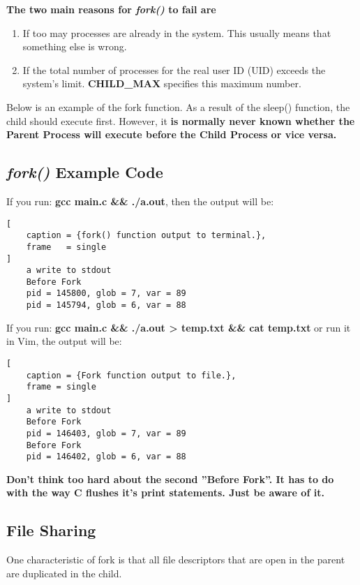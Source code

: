 \documentclass{article}
\newcommand\be[1]{\textbf{\emph{#1}}}
\begin{document}
\textbf{The two main reasons for \emph{fork()} to fail are }
\begin{enumerate}
    \item If too may processes are already in the system.
        This usually means that something else is wrong.
    \item If the total number of processes for the 
        real user ID (UID) exceeds the system's limit.
        \textbf{CHILD\_MAX} specifies this maximum number.
\end{enumerate}

        Below is an example of the fork function. As a result of the sleep()
        function, the child should execute first. However, it \textbf{is normally never known
        whether the Parent Process will execute before the Child Process or vice versa.} \newline

\subsection{\be{fork()} Example Code}


\newpage
    If you run: \textbf{gcc main.c \&\& ./a.out}, then the output will be:
\begin{lstlisting}[
    caption = {fork() function output to terminal.}, 
    frame   = single
]
    a write to stdout
    Before Fork
    pid = 145800, glob = 7, var = 89
    pid = 145794, glob = 6, var = 88 
\end{lstlisting}
    \hfill

    If you run: \textbf{gcc main.c \&\& ./a.out \textgreater{} temp.txt \&\& cat temp.txt}
    or run it in Vim, the output will be:

\begin{lstlisting}[
    caption = {Fork function output to file.},
    frame = single
]
    a write to stdout
    Before Fork
    pid = 146403, glob = 7, var = 89
    Before Fork
    pid = 146402, glob = 6, var = 88
\end{lstlisting}
    \hfill


\textbf{Don't think too hard about the second ''Before Fork''. 
It has to do with the way C flushes it's print statements.
Just be aware of it.}

\subsection{File Sharing}
One characteristic of fork is that all file descriptors that are
open in the parent are duplicated in the child.
\end{document}
